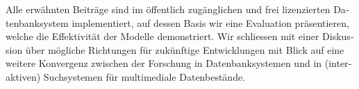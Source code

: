 \begin{otherlanguage}{ngerman}
Alle erwähnten Beiträge sind im öffentlich zugänglichen und frei lizenzierten Datenbanksystem \cottontail{} implementiert, auf dessen Basis wir eine Evaluation präsentieren, welche die Effektivität der Modelle demonstriert. Wir schliessen mit einer Diskussion über mögliche Richtungen für zukünftige Entwicklungen mit Blick auf eine weitere Konvergenz zwischen der Forschung in Datenbanksystemen und in (interaktiven) Suchsystemen für multimediale Datenbestände.
\end{otherlanguage}

\cleardoublepage
